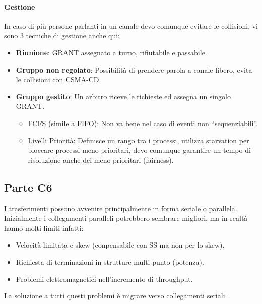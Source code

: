\documentclass[12pt]{article}
\begin{document}
\paragraph{Gestione}
In caso di più persone parlanti in un canale devo comunque evitare le collisioni, vi sono 3 tecniche di gestione anche qui:
\begin{itemize}
  \item \textbf{Riunione}: GRANT assegnato a turno, rifiutabile e passabile.
  \item \textbf{Gruppo non regolato}: Possibilità di prendere parola a canale libero, evita le collisioni con CSMA-CD.
  \item \textbf{Gruppo gestito}: Un arbitro riceve le richieste ed assegna un singolo GRANT.
  \begin{itemize}
    \item FCFS (simile a FIFO): Non va bene nel caso di eventi non ``sequenziabili''.
    \item Livelli Priorità: Definisce un rango tra i processi, utilizza starvation per bloccare processi meno prioritari, devo comunque garantire un tempo di risoluzione anche dei meno prioritari (fairness).
  \end{itemize}
\end{itemize}

\subsection{Parte C6}\label{c6}
I trasferimenti possono avvenire principalmente in forma seriale o parallela.\\
Inizialmente i collegamenti paralleli potrebbero sembrare migliori, ma in realtà hanno molti limiti infatti:
\begin{itemize}
  \item Velocità limitata e skew (conpensabile con SS ma non per lo skew).
  \item Richiesta di terminazioni in strutture multi-punto (potenza).
  \item Problemi elettromagnetici nell'incremento di throughput.
\end{itemize}
La soluzione a tutti questi problemi è migrare verso collegamenti seriali.
\end{document}
